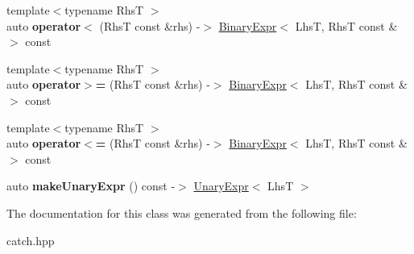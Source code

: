 \begin{DoxyCompactItemize}
\item 
{\footnotesize template$<$typename RhsT $>$ }\\auto {\bfseries operator$<$} (RhsT const \&rhs) -\/$>$ \hyperlink{classCatch_1_1BinaryExpr}{Binary\+Expr}$<$ LhsT, RhsT const \& $>$ const \hypertarget{classCatch_1_1ExprLhs_a1ae37b86c3156b5fbcaaf02726489f85}{}\label{classCatch_1_1ExprLhs_a1ae37b86c3156b5fbcaaf02726489f85}

\item 
{\footnotesize template$<$typename RhsT $>$ }\\auto {\bfseries operator$>$=} (RhsT const \&rhs) -\/$>$ \hyperlink{classCatch_1_1BinaryExpr}{Binary\+Expr}$<$ LhsT, RhsT const \& $>$ const \hypertarget{classCatch_1_1ExprLhs_af367c2fe8f97d6f103988627843ad613}{}\label{classCatch_1_1ExprLhs_af367c2fe8f97d6f103988627843ad613}

\item 
{\footnotesize template$<$typename RhsT $>$ }\\auto {\bfseries operator$<$=} (RhsT const \&rhs) -\/$>$ \hyperlink{classCatch_1_1BinaryExpr}{Binary\+Expr}$<$ LhsT, RhsT const \& $>$ const \hypertarget{classCatch_1_1ExprLhs_a9a5551293bfe9440ef190cb2b20bc0f8}{}\label{classCatch_1_1ExprLhs_a9a5551293bfe9440ef190cb2b20bc0f8}

\item 
auto {\bfseries make\+Unary\+Expr} () const -\/$>$ \hyperlink{classCatch_1_1UnaryExpr}{Unary\+Expr}$<$ LhsT $>$\hypertarget{classCatch_1_1ExprLhs_ab68bd6d5d3ae21b7fba9010150fba95d}{}\label{classCatch_1_1ExprLhs_ab68bd6d5d3ae21b7fba9010150fba95d}

\end{DoxyCompactItemize}


The documentation for this class was generated from the following file\+:\begin{DoxyCompactItemize}
\item 
catch.\+hpp\end{DoxyCompactItemize}
